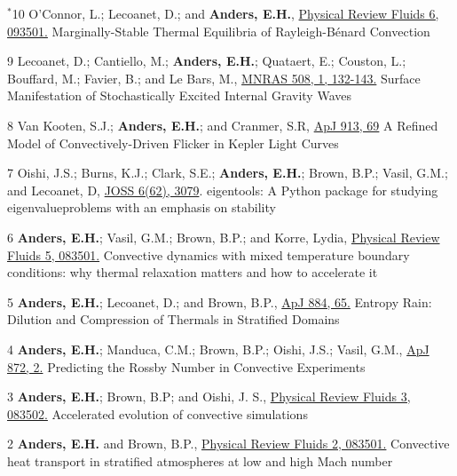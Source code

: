 	  {$^*$10}
	  {
		O'Connor, L.; Lecoanet, D.; and \textbf{Anders, E.H.}, 
		  \href{https://journals.aps.org/prfluids/abstract/10.1103/PhysRevFluids.6.093501}{Physical Review Fluids 6, 093501.}
	  }
	  {Marginally-Stable Thermal Equilibria of Rayleigh-B\'{e}nard Convection}

\cvpub{}
	  {9}
	  {
		Lecoanet, D.; Cantiello, M.; \textbf{Anders, E.H.}; Quataert, E.; Couston, L.; Bouffard, M.; Favier, B.; and Le Bars, M.,
          \href{https://doi.org/10.1093/mnras/stab2524}{MNRAS 508, 1, 132-143.}
	  }
	  {Surface Manifestation of Stochastically Excited Internal Gravity Waves}

\cvpub{}
	  {8}
	  {
		 Van Kooten, S.J.; \textbf{Anders, E.H.}; and Cranmer, S.R,
		  \href{https://iopscience.iop.org/article/10.3847/1538-4357/abf7bf}{ApJ 913, 69}
	  }
	  {A Refined Model of Convectively-Driven Flicker in Kepler Light Curves}

\cvpub{}
	  {7}
	  {
		Oishi, J.S.; Burns, K.J.; Clark, S.E.; \textbf{Anders, E.H.}; Brown, B.P.; Vasil, G.M.; and Lecoanet, D,
		  \href{https://joss.theoj.org/papers/10.21105/joss.03079}{JOSS 6(62), 3079}.
	  }
	  {eigentools: A Python package for studying eigenvalueproblems with an emphasis on stability}

	  {6}
	  {
		  \textbf{Anders, E.H.}; Vasil, G.M.; Brown, B.P.; and Korre, Lydia, 
		  \href{https://journals.aps.org/prfluids/abstract/10.1103/PhysRevFluids.5.083501}{Physical Review Fluids 5, 083501.}
	  }
	  {Convective dynamics with mixed temperature boundary conditions: why thermal relaxation matters and how to accelerate it}

	  {5}
	  {
		  \textbf{Anders, E.H.}; Lecoanet, D.; and Brown, B.P., 
		  \href{https://iopscience.iop.org/article/10.3847/1538-4357/ab3644}{ApJ 884, 65.}
	  }
	  {Entropy Rain: Dilution and Compression of Thermals in Stratified Domains}

\cvpub{}
	  {4}
	  {
		  \textbf{Anders, E.H.}; Manduca, C.M.; Brown, B.P.; Oishi, J.S.; Vasil, G.M., 
		  \href{https://iopscience.iop.org/article/10.3847/1538-4357/aaff61}{ApJ 872, 2.}
	  }
	  {Predicting the Rossby Number in Convective Experiments}

	  {3}
	  {
		  \textbf{Anders, E.H.}; Brown, B.P; and Oishi, J. S.,
		  \href{https://journals.aps.org/prfluids/abstract/10.1103/PhysRevFluids.3.083502}{Physical Review Fluids 3, 083502.}
	  }
	  {Accelerated evolution of convective simulations}

	  {2}
	  {
		  \textbf{Anders, E.H.} and Brown, B.P.,
		  \href{https://journals.aps.org/prfluids/abstract/10.1103/PhysRevFluids.2.083501}{Physical Review Fluids 2, 083501.}
	  }
	  {Convective heat transport in stratified atmospheres at low and high Mach number}

